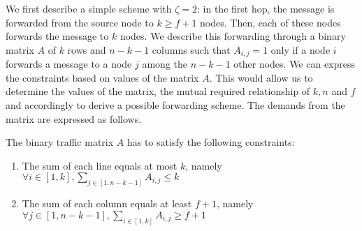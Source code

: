We first describe a simple scheme with $\zeta=2$:  in the first hop, the message is forwarded from the source node to $k \ge f+1$ nodes. Then, each of these nodes forwards the message to $k$ nodes. 
We describe this forwarding through a binary matrix $A$ of $k$ rows and $n-k-1$ columns such that $A_{i,j} = 1$ only if a node $i$ forwards a message to a node $j$ among the $n-k-1$ other nodes. 
We can express the constraints based on values of the matrix $A$. This would allow us to determine the values of the matrix, the mutual required relationship  of $k,n$ and $f$ and accordingly to derive  a possible forwarding scheme. 
The demands from the matrix are expressed as follows.
\begin{property}
The binary traffic matrix $A$ has to satisfy the following  constraints:
\begin{enumerate}
\item The sum of each line equals at most $k$, namely $\forall i \in [1,k], \sum_{j \in [1,n-k-1]}{A_{i,j}} \le k$
\item The sum of each column equals at least $f+1$, namely $\forall j \in [1,n-k-1], \sum_{i \in [1,k]}{A_{i,j}} \ge f+1$
\end{enumerate}
\end{property}


